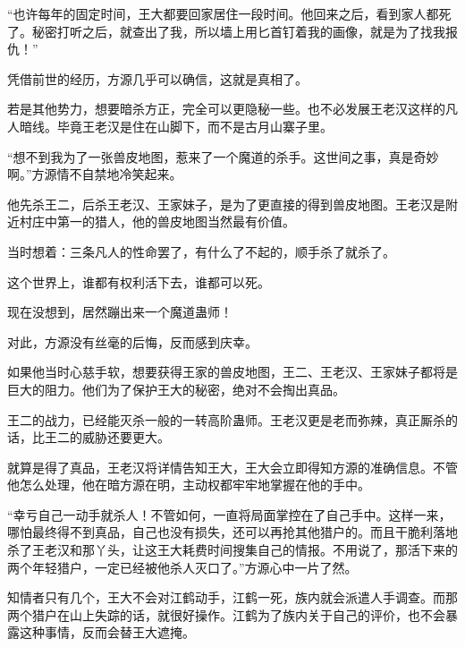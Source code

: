 \begin{this_body}
“也许每年的固定时间，王大都要回家居住一段时间。他回来之后，看到家人都死了。秘密打听之后，就查出了我，所以墙上用匕首钉着我的画像，就是为了找我报仇！”

凭借前世的经历，方源几乎可以确信，这就是真相了。

若是其他势力，想要暗杀方正，完全可以更隐秘一些。也不必发展王老汉这样的凡人暗线。毕竟王老汉是住在山脚下，而不是古月山寨子里。

“想不到我为了一张兽皮地图，惹来了一个魔道的杀手。这世间之事，真是奇妙啊。”方源情不自禁地冷笑起来。

他先杀王二，后杀王老汉、王家妹子，是为了更直接的得到兽皮地图。王老汉是附近村庄中第一的猎人，他的兽皮地图当然最有价值。

当时想着：三条凡人的性命罢了，有什么了不起的，顺手杀了就杀了。

这个世界上，谁都有权利活下去，谁都可以死。

现在没想到，居然蹦出来一个魔道蛊师！

对此，方源没有丝毫的后悔，反而感到庆幸。

如果他当时心慈手软，想要获得王家的兽皮地图，王二、王老汉、王家妹子都将是巨大的阻力。他们为了保护王大的秘密，绝对不会掏出真品。

王二的战力，已经能灭杀一般的一转高阶蛊师。王老汉更是老而弥辣，真正厮杀的话，比王二的威胁还要更大。

就算是得了真品，王老汉将详情告知王大，王大会立即得知方源的准确信息。不管他怎么处理，他在暗方源在明，主动权都牢牢地掌握在他的手中。

“幸亏自己一动手就杀人！不管如何，一直将局面掌控在了自己手中。这样一来，哪怕最终得不到真品，自己也没有损失，还可以再抢其他猎户的。而且干脆利落地杀了王老汉和那丫头，让这王大耗费时间搜集自己的情报。不用说了，那活下来的两个年轻猎户，一定已经被他杀人灭口了。”方源心中一片了然。

知情者只有几个，王大不会对江鹤动手，江鹤一死，族内就会派遣人手调查。而那两个猎户在山上失踪的话，就很好操作。江鹤为了族内关于自己的评价，也不会暴露这种事情，反而会替王大遮掩。

\end{this_body}

